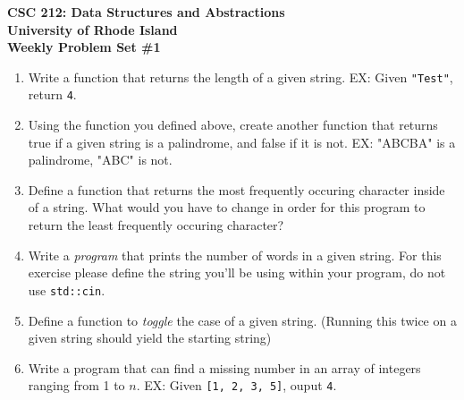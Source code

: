\documentclass[11pt]{article}
\begin{document}
\thispagestyle{empty}

\begin{center}
    {\Large\bf CSC 212: Data Structures and Abstractions}\\
    \medskip
    {\Large\bf University of Rhode Island}\\
    \bigskip
    {\Large\bf Weekly Problem Set \#1}
\end{center}

\vspace{25pt} 

\begin{enumerate}[leftmargin=*]

\item Write a function that returns the length of a given string. EX: Given \verb|"Test"|, return \verb|4|.

\vspace{4in}

\item Using the function you defined above, create another function that returns true if a given string is a palindrome, and false if it is not. EX: "ABCBA" is a palindrome, "ABC" is not.

\vspace{4in}

\item Define a function that returns the most frequently occuring character inside of a string. What would you have to change in order for this program to return the least frequently occuring character? 

\vspace{4in}

\item Write a \textit{program} that prints the number of words in a given string. For this exercise please define the string you'll be using within your program, do not use \verb|std::cin|.

\vspace{4in}

\item Define a function to \textit{toggle} the case of a given string. (Running this twice on a given string should yield the starting string)

\vspace{4in}

\item Write a program that can find a missing number in an array of integers ranging from 1 to $n$. EX: Given \verb|[1, 2, 3, 5]|, ouput \verb|4|. 


\end{enumerate}
\end{document}
